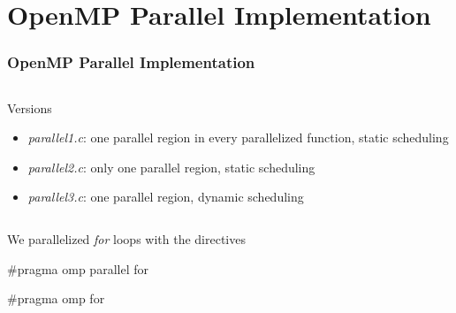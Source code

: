 \documentclass{beamer}
\begin{document}
\section{OpenMP Parallel Implementation}
\begin{frame}[fragile]
	\frametitle{OpenMP Parallel Implementation}

	\begin{columns}
		\begin{block}{Versions}
			\begin{itemize}
				\item \emph{parallel1.c}: one parallel region in every parallelized function, static scheduling
				\item \emph{parallel2.c}: only one parallel region, static scheduling
				\item \emph{parallel3.c}: one parallel region, dynamic scheduling
			\end{itemize}
		\end{block}
	\end{columns}

	\vfill
	We parallelized \emph{for} loops with the directives \begin{semiverbatim}#pragma omp parallel for\end{semiverbatim} \begin{semiverbatim}#pragma omp for\end{semiverbatim}
\end{frame}
\end{document}
